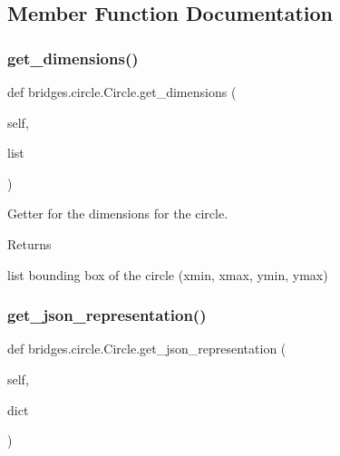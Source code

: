 \subsection{Member Function Documentation}
\mbox{\label{classbridges_1_1circle_1_1_circle_a8b6af5d39ec48245f0244a7499082822}} 
\subsubsection{\texorpdfstring{get\+\_\+dimensions()}{get\_dimensions()}}
{\footnotesize\ttfamily def bridges.\+circle.\+Circle.\+get\+\_\+dimensions (\begin{DoxyParamCaption}\item[{}]{self,  }\item[{}]{list }\end{DoxyParamCaption})}



Getter for the dimensions for the circle. 

\begin{DoxyReturn}{Returns}


list bounding box of the circle (xmin, xmax, ymin, ymax) 
\end{DoxyReturn}
\mbox{\label{classbridges_1_1circle_1_1_circle_a7a1be40bcd6028dab0a5bcab6e69c355}} 
\subsubsection{\texorpdfstring{get\+\_\+json\+\_\+representation()}{get\_json\_representation()}}
{\footnotesize\ttfamily def bridges.\+circle.\+Circle.\+get\+\_\+json\+\_\+representation (\begin{DoxyParamCaption}\item[{}]{self,  }\item[{}]{dict }\end{DoxyParamCaption})}



